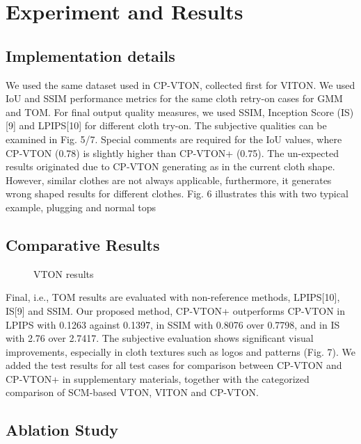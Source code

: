 
\section{Experiment and Results} 

\subsection{Implementation details} 

We used the same dataset used in CP-VTON, collected first for VITON. We used IoU and SSIM performance metrics for the same cloth retry-on cases for GMM and TOM. For final output quality measures, we used SSIM, Inception Score (IS)[9] and LPIPS[10] for different cloth try-on. The subjective qualities can be examined in Fig. 5/7.  Special comments are required for the IoU values, where CP-VTON (0.78) is slightly higher than CP-VTON+ (0.75). The un-expected results originated due to CP-VTON generating as in the current cloth shape. However, similar clothes are not always applicable, furthermore, it generates wrong shaped results for different clothes. Fig. 6 illustrates this with two typical example, plugging and normal tops

\subsection{Comparative Results}

\begin{figure}
\centering
\caption{VTON results}
\label{fig:vtonresults}
\end{figure}


Final, i.e., TOM results are evaluated with non-reference methods, LPIPS[10], IS[9] and SSIM. Our proposed method, CP-VTON+ outperforms CP-VTON in LPIPS with 0.1263 against 0.1397, in SSIM with 0.8076 over 0.7798, and in IS with 2.76 over 2.7417. The subjective evaluation shows significant visual improvements, especially in cloth textures such as logos and patterns (Fig. 7). We added the test results for all test cases for comparison between CP-VTON and CP-VTON+ in supplementary materials, together with the categorized comparison of SCM-based VTON, VITON and CP-VTON.


\subsection{Ablation Study}

